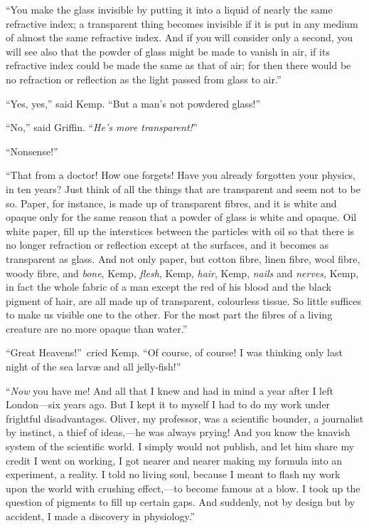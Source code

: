 “You make the glass invisible by putting it into a liquid of nearly the same refractive index; a transparent thing becomes invisible if it is put in any medium of almost the same refractive index. And if you will consider only a second, you will see also that the powder of glass might be made to vanish in air, if its refractive index could be made the same as that of air; for then there would be no refraction or reflection as the light passed from glass to air.”

“Yes, yes,” said Kemp. “But a man’s not powdered glass!”

“No,” said Griffin. “\emph{He’s more transparent!}”

“Nonsense!”

“That from a doctor! How one forgets! Have you already forgotten your physics, in ten years? Just think of all the things that are transparent and seem not to be so. Paper, for instance, is made up of transparent fibres, and it is white and opaque only for the same reason that a powder of glass is white and opaque. Oil white paper, fill up the interstices between the particles with oil so that there is no longer refraction or reflection except at the surfaces, and it becomes as transparent as glass. And not only paper, but cotton fibre, linen fibre, wool fibre, woody fibre, and \emph{bone}, Kemp, \emph{flesh}, Kemp, \emph{hair}, Kemp, \emph{nails} and \emph{nerves}, Kemp, in fact the whole fabric of a man except the red of his blood and the black pigment of hair, are all made up of transparent, colourless tissue. So little suffices to make us visible one to the other. For the most part the fibres of a living creature are no more opaque than water.”

“Great Heavens!”\ cried Kemp. “Of course, of course! I was thinking only last night of the sea larvæ and all jelly-fish!”

“\emph{Now} you have me! And all that I knew and had in mind a year after I left London—six years ago. But I kept it to myself I had to do my work under frightful disadvantages. Oliver, my professor, was a scientific bounder, a journalist by instinct, a thief of ideas,—he was always prying! And you know the knavish system of the scientific world. I simply would not publish, and let him share my credit I went on working, I got nearer and nearer making my formula into an experiment, a reality. I told no living soul, because I meant to flash my work upon the world with crushing effect,—to become famous at a blow. I took up the question of pigments to fill up certain gaps. And suddenly, not by design but by accident, I made a discovery in physiology.”

